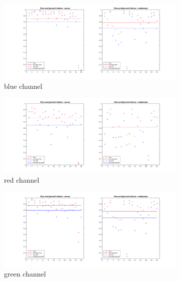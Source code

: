 \documentclass[a4paper,10pt]{article}
\begin{document}
\begin{figure}
	
	\begin{subfigure}{0.7\textwidth}
		\includegraphics[width=0.9\linewidth]{../results/color-channel-influence/base-evaluation/otsu-dice-jaccard-B.png} 
		\caption{blue channel}
		\label{fig:otsu-blue}
	\end{subfigure}
	\begin{subfigure}{0.7\textwidth}
		\includegraphics[width=0.9\linewidth]{../results/color-channel-influence/base-evaluation/otsu-dice-jaccard-R.png}
		\caption{red channel}
		\label{fig:otsu-red}
	\end{subfigure}
	\begin{subfigure}{0.7\textwidth}
		\includegraphics[width=0.9\linewidth]{../results/color-channel-influence/base-evaluation/otsu-dice-jaccard-G.png}
		\caption{green channel}
		\label{fig:otsu-green}
	\end{subfigure}
	\begin{subfigure}{0.7\textwidth}

\end{subfigure}
\end{figure}
\end{document}
